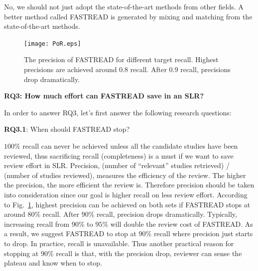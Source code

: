 \documentclass{svjour3}
\theoremstyle{break}
\begin{document}
\begin{lesson}
    No, we should not just adopt the state-of-the-art methods from other fields. A better method called FASTREAD is generated by mixing and matching from the state-of-the-art methods.
\end{lesson}





\begin{figure}[t]
    \centering
    \texttt{[image: PoR.eps]}
    \caption{The precision of FASTREAD for different target recall. Highest precisions are achieved around 0.8 recall. After 0.9 recall, precisions drop dramatically.}
    \label{fig:precision}
\end{figure}

\textbf{RQ3: How much effort can FASTREAD save in an SLR?}

In order to answer RQ3, let's first answer the following research questions:

\textbf{RQ3.1}: When should FASTREAD stop?

$100\%$ recall can never be achieved unless all the candidate studies have been reviewed, thus sacrificing recall (completeness) is a must if we want to save review effort in SLR. Precision, (number of ``relevant'' studies retrieved) / (number of studies reviewed), measures the efficiency of the review. The higher the precision, the more efficient the review is. Therefore precision should be taken into consideration since our goal is higher recall on less review effort. According to Fig.~\ref{fig:precision}, highest precision can be achieved on both sets if FASTREAD stops at around $80\%$ recall. After $90\%$ recall, precision drops dramatically. Typically, increasing recall from $90\%$ to $95\%$ will double the review cost of FASTREAD. As a result, we suggest FASTREAD to stop at $90\%$ recall where precision just starts to drop. In practice, recall is unavailable. Thus another practical reason for stopping at $90\%$ recall is that, with the precision drop, reviewer can sense the plateau and know when to stop. 
\end{document}

